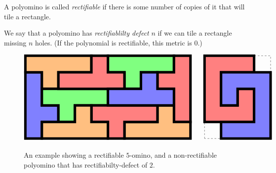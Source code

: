 \documentclass{article}
\begin{document}

A polyomino is called \emph{rectifiable} if there is some number of copies of it that will tile a rectangle.

We say that a polyomino has \emph{rectifiablilty defect} $n$ if we can tile a rectangle missing $n$ holes. (If the polynomial is rectifiable, this metric is $0$.)

\begin{figure}[ht!]
  \[
  \begin{tikzpicture}
    \draw[fill=blue!50!white, line width=0.15cm, xshift=0cm, yshift=0cm] (0,0)--(1,0)--(1,1)--(2,1)--(2,2)--(1,2)--(1,4)--(0,4)--cycle;
    \draw[fill=orange!50!white, line width=0.15cm,xshift=0cm, yshift=3cm] (0,1)--(1,1)--(1,0)--(2,0)--(2,1)--(4,1)--(4,2)--(0,2)--cycle;
    \draw[fill=green!50!white, line width=0.15cm,xshift=5cm, yshift=3cm] (0,1)--(1,1)--(1,0)--(2,0)--(2,1)--(4,1)--(4,2)--(0,2)--cycle;
    \draw[fill=green!50!white, line width=0.15cm,xshift=1cm, yshift=1cm] (0,1)--(1,1)--(1,0)--(2,0)--(2,1)--(4,1)--(4,2)--(0,2)--cycle;
    \draw[fill=red!50!white, line width=0.15cm,xshift=2cm, yshift=3cm] (0,0)--(4,0)--(4,1)--(3,1)--(3,2)--(2,2)--(2,1)--(0,1)--cycle;

    \draw[fill=red!50!white, line width=0.15cm,xshift=8cm, yshift=1cm] (0,2)--(1,2)--(1,0)--(2,0)--(2,4)--(1,4)--(1,3)--(0,3)--cycle;
    \draw[fill=orange!50!white, line width=0.15cm,xshift=6cm, yshift=0cm] (0,0)--(4,0)--(4,1)--(3,1)--(3,2)--(2,2)--(2,1)--(0,1)--cycle;
    \draw[fill=red!50!white, line width=0.15cm,xshift=4cm, yshift=0cm] (0,1)--(1,1)--(1,0)--(2,0)--(2,1)--(4,1)--(4,2)--(0,2)--cycle;
    \draw[fill=orange!50!white, line width=0.15cm,xshift=1cm, yshift=0cm] (0,0)--(4,0)--(4,1)--(3,1)--(3,2)--(2,2)--(2,1)--(0,1)--cycle;
    \draw[fill=blue!50!white, line width=0.15cm,xshift=5cm, yshift=2cm] (0,0)--(4,0)--(4,1)--(3,1)--(3,2)--(2,2)--(2,1)--(0,1)--cycle;
  \end{tikzpicture}
  \qquad
  \begin{tikzpicture}
    \draw[dashed] (0,-1) rectangle (4,4);
    \fill[red!50!white, draw=black, line width=0.15cm, xshift=0cm, yshift=0cm] (0,0)--(3,0)--(3,2)--(2,2)--(2,1)--(1,1)--(1,3)--(3,3)--(3,4)--(0,4)--cycle;
    \fill[blue!50!white, draw=black, line width=0.15cm, rotate around={180:(0,0)}, xshift=-4cm, yshift=-3cm] (0,0)--(3,0)--(3,2)--(2,2)--(2,1)--(1,1)--(1,3)--(3,3)--(3,4)--(0,4)--cycle;
  \end{tikzpicture}
  \]
  \caption{
    An example showing a rectifiable $5$-omino, and a non-rectifiable polyomino that has rectifiabilty-defect of $2$.
  }
\end{figure}
\end{document}

